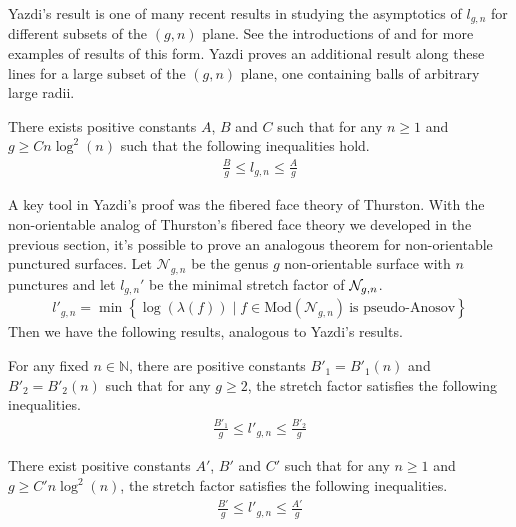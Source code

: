 Yazdi's result is one of many recent results in studying the asymptotics of $l_{g,n}$ for different subsets of
the $(g,n)$ plane. See the introductions of \cite{yazdi2018pseudo} and \cite{tsai2009asymptotic} for more
examples of results of this form. Yazdi proves an additional result along these lines for a large subset of
the $(g,n)$ plane, one containing balls of arbitrary large radii.

\begin{thm}[Yazdi]
    \label{thm:yazdi2}
    There exists positive constants $A$, $B$ and $C$ such that for any $n \geq 1$ and $g \geq Cn\log^2(n)$ such that
    the following inequalities hold.
    \begin{align*}
        \frac{B}{g} \leq l_{g,n} \leq \frac{A}{g}
    \end{align*}

\end{thm}
A key tool in Yazdi's proof was the fibered face theory of Thurston. With the non-orientable analog of
Thurston's fibered face theory we developed in the previous section, it's possible to prove an analogous
theorem for non-orientable punctured surfaces.  Let $\mathcal{N}_{g,n}$ be the genus $g$ non-orientable
surface with $n$ punctures and let $l_{g,n}'$ be the minimal stretch factor of $\mathcal{N}_{g,n}$.
\begin{align*}
  l'_{g,n} = \min\left\{\log(\lambda(f)) \mid f \in \text{Mod}(\mathcal{N}_{g,n})\ \text{is pseudo-Anosov}\right\}
\end{align*}
Then we have the following results, analogous to Yazdi's results.
\begin{thm}
  \label{thm:stretch1}
  For any fixed $n \in \mathbb{N}$, there are positive constants $B'_1 = B'_1(n)$ and $B'_2 = B'_2(n)$ such that
  for any $g \geq 2$, the stretch factor satisfies the following inequalities.
  \begin{align*}
    \frac{B'_1}{g} \leq l'_{g,n} \leq \frac{B'_2}{g}
  \end{align*}
\end{thm}

\begin{thm}
  \label{thm:stretch2}
  There exist positive constants $A'$, $B'$ and $C'$ such that for any $n \geq 1$ and $g \geq C'n\log^2(n)$,
  the stretch factor satisfies the following inequalities.
  \begin{align*}
    \frac{B'}{g} \leq l'_{g,n} \leq \frac{A'}{g}
  \end{align*}
\end{thm}

